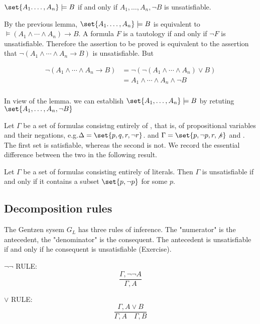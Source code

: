 \begin{lemma}
$\set{A_1. \ldots , A_n} \models B$ if and only if $A_1, \ldots , A_n, \neg B$ is unsatisfiable.
\end{lemma}

 By the previous lemma, $\set{A_1. \ldots , A_n} \models B$  is equivalent to $\models (A_1 \land \cdots \land A_n) \to B$. A formula $F$ is a tautology if and only if $\neg F$ is unsatisfiable.  Therefore the assertion to be proved is equivalent to the assertion that $\neg (A_1 \land \cdots \land A_n \to B)$ is unsatisfiable.  But 

\begin{align}
  \neg (A_1 \land \cdots \land A_n \to B) &=  \neg(\neg(A_1 \land \cdots \land A_n) \lor B) \\
  &= A_1 \land \cdots \land A_n \land \neg B \\
\end{align}


In view of the lemma. we can establish $\set{A_1, \ldots, A_n} \models B$ by retuting $\set{A_1,  \ldots , A_n, \neg B}$

Let $\Gamma$ be a set of formulas consistng entirely of , that is, of propositional variables and their negations, e.g.$\Delta = \set{p, q, r, \neg r}$. and  $\Gamma = \set{p, \neg p, r, \not s}$ and  . The first set is satisfiable, whereas the second is not.  We record the essential difference between the two in the following result.

\begin{lemma}
Let $\Gamma$ be a set of formulas consisting entirely of literals.  Then $\Gamma$ is unsatisfiable if and only if it contains a subset $\set{p, \neg p}$ for some $p$.
\end{lemma}

\subsection{Decomposition rules}

The Gentzen sysem $G_L$ has three rules of inference.    The "numerator" is the antecedent, the "denominator" is the consequent.  The antecedent is unsatisfiable if and only if he consequent is unsatisfiable (Exercise).

$\neg\neg$ RULE: $$\frac{\Gamma, \neg\neg A}{\Gamma, A} $$ 

$\lor$ RULE: $$\frac{\Gamma, A \lor B}{\Gamma, A \quad \Gamma, B} $$ 

